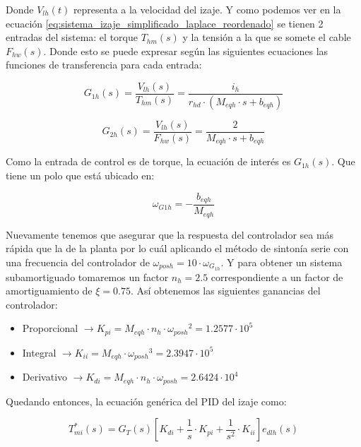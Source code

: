 \documentclass[11pt]{article}
\begin{document}
Donde $V_{lh}(t)$ representa a la velocidad del izaje. Y como podemos ver en la ecuación \ref{eq:sistema_izaje_simplificado_laplace_reordenado} se tienen 2 entradas del sistema: el torque $T_{hm}(s)$ y la tensión a la que se somete el cable $F_{hw}(s)$. Donde esto se puede expresar según las siguientes ecuaciones las funciones de transferencia para cada entrada:

\begin{equation}
	\label{eq:sistema_izaje_simplificado_laplace_G1h}
	G_{1h}(s)=\frac{V_{lh}(s)}{T_{hm}(s)}=\frac{i_{h}}{r_{hd}\cdot (M_{eqh}\cdot s+b_{eqh})}
\end{equation}

\begin{equation}
	\label{eq:sistema_izaje_simplificado_laplace_G2h}
	G_{2h}(s)=\frac{V_{lh}(s)}{F_{hw}(s)}=\frac{2}{M_{eqh}\cdot s+b_{eqh}}
\end{equation}

Como la entrada de control es de torque, la ecuación de interés es $G_{1h}(s)$. Que tiene un polo que está ubicado en:

\begin{equation}
	\label{eq:sistema_izaje_simplificado_laplace_polos}
	\omega_{G1h}=-\frac{b_{eqh}}{M_{eqh}}
\end{equation}

Nuevamente tenemos que asegurar que la respuesta del controlador sea más rápida que la de la planta por lo cuál aplicando el método de sintonía serie con una frecuencia del controlador de $\omega_{posh}=10\cdot \omega_{G_{1h}}$. Y para obtener un sistema subamortiguado tomaremos un factor $n_{h}=2.5$ correspondiente a un factor de amortiguamiento de $\xi =0.75$. Así obtenemos las siguientes ganancias del controlador:

\begin{itemize}
	\item Proporcional $\rightarrow K_{pi} = M_{eqh}\cdot n_{h}\cdot {\omega_{posh}}^{2} = 1.2577 \cdot 10^5$
	\item Integral $\rightarrow K_{ii} = M_{eqh}\cdot {\omega_{posh}}^{3}  = 2.3947 \cdot 10^5$
	\item Derivativo $\rightarrow K_{di} = M_{eqh}\cdot n_{h}\cdot {\omega_{posh}} = 2.6424\cdot 10^4$
\end{itemize}

Quedando entonces, la ecuación genérica del PID del izaje como:

\begin{equation}
	\label{eq:sistema_izaje_simplificado_laplace_controlador}
	T_{mi}^{*}(s)=G_{T}(s)\left [ K_{di}+\frac{1}{s}\cdot K_{pi}+\frac{1}{s^{2}}\cdot K_{ii} \right ] e_{dlh}(s)
\end{equation}
\end{document}
